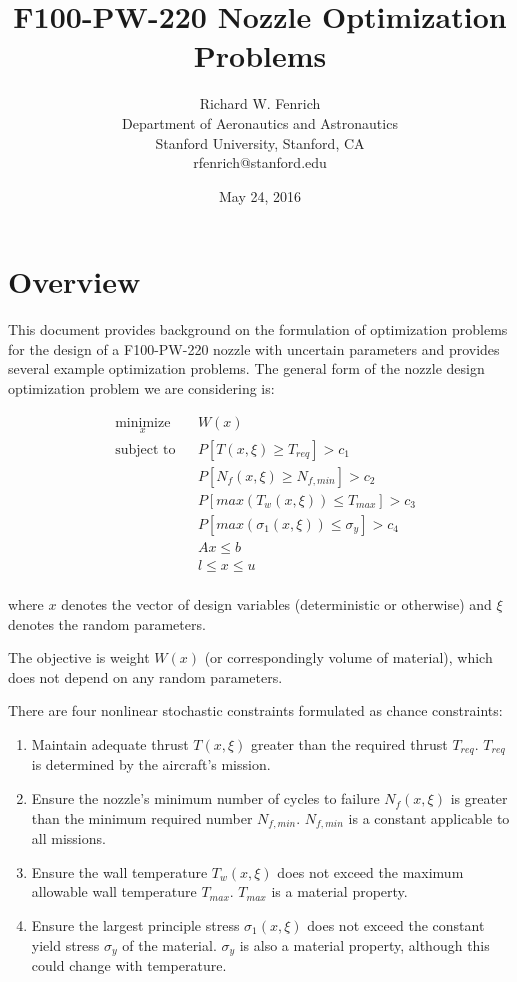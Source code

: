 \documentclass{article}
\title{F100-PW-220 Nozzle Optimization Problems}
\author{Richard W. Fenrich\\Department of Aeronautics and Astronautics\\Stanford University, Stanford, CA\\rfenrich@stanford.edu}
\date{May 24, 2016}
\begin{document}
\maketitle

\section{Overview}
This document provides background on the formulation of optimization problems for the design of a F100-PW-220 nozzle with uncertain parameters and provides several example optimization problems. The general form of the nozzle design optimization problem we are considering is:

\begin{equation}
\label{eq:generalFormulation}
\begin{aligned}
& \underset{x}{\text{minimize}}
& & W(x)  \\
& \text{subject to}
& &  P [ T(x,\xi) \geq T_{req} ] > c_1 \\
& & & P [ N_f(x,\xi) \geq N_{f,min} ] > c_2 \\
& & & P [ max( T_w (x,\xi) ) \leq T_{max} ] > c_3 \\
& & & P [ max( \sigma_1 (x,\xi) ) \leq \sigma_{y} ] > c_4 \\
& & & A x \leq b \\
& & & l \leq x \leq u \\
\end{aligned}
\end{equation}

where $x$ denotes the vector of design variables (deterministic or otherwise) and $\xi$ denotes the random parameters.

The objective is weight $W(x)$ (or correspondingly volume of material), which does not depend on any random parameters.

There are four nonlinear stochastic constraints formulated as chance constraints:
\begin{enumerate}
\item Maintain adequate thrust $T(x,\xi)$ greater than the required thrust $T_{req}$. $T_{req}$ is determined by the aircraft's mission.
\item Ensure the nozzle's minimum number of cycles to failure $N_f(x,\xi)$ is greater than the minimum required number $N_{f,min}$. $N_{f,min}$ is a constant applicable to all missions.
\item Ensure the wall temperature $T_w(x,\xi)$ does not exceed the maximum allowable wall temperature $T_{max}$. $T_{max}$ is a material property.
\item Ensure the largest principle stress $\sigma_1(x,\xi)$ does not exceed the constant yield stress $\sigma_y$ of the material. $\sigma_y$ is also a material property, although this could change with temperature.
\end{enumerate}
\end{document}

